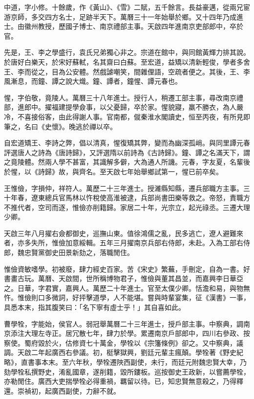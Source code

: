 \begin{pinyinscope}
中道，字小修。十餘歲，作《黃山》、《雪》二賦，五千餘言。長益豪邁，從兩兄宦游京師，多交四方名士，足跡半天下。萬曆三十一年始舉於鄉。又十四年乃成進士。由徽州教授，歷國子博士、南京禮部主事。天啟四年進南京吏部郎中，卒於官。

先是，王、李之學盛行，袁氏兄弟獨心非之。宗道在館中，與同館黃輝力排其說。於唐好白樂天，於宋好蘇軾，名其齋曰白蘇。至宏道，益矯以清新輕俊，學者多舍王、李而從之，目為公安體。然戲謔嘲笑，間雜俚語，空疏者便之。其後，王、李風漸息，而鐘、譚之說大熾。鐘、譚者，鐘惺、譚元春也。

惺，字伯敬，竟陵人。萬曆三十八年進士。授行人，稍遷工部主事，尋改南京禮部，進郎中。擢福建提學僉事，以父憂歸，卒於家。惺貌寢，羸不勝衣，為人嚴冷，不喜接俗客，由此得謝人事。官南都，僦秦淮水閣讀史，恒至丙夜，有所見即筆之，名曰《史懷》。晚逃於禪以卒。

自宏道矯王、李詩之弊，倡以清真，惺復矯其弊，變而為幽深孤峭。與同里譚元春評選唐人之詩為《唐詩歸》，又評選隋以前詩為《古詩歸》。鐘、譚之名滿天下，謂之竟陵體。然兩人學不甚富，其識解多僻，大為通人所譏。元春，字友夏，名輩後於惺，以《詩歸》故，與齊名。至天啟七年始舉鄉試第一，惺已前卒矣。

王惟儉，字損仲，祥符人。萬歷二十三年進士。授濰縣知縣，遷兵部職方主事。三十年春，遼東總兵官馬林以忤稅使高淮被逮，兵部尚書田樂等救之。帝怒，責職方不推代者，空司而逐，惟儉亦削籍歸。家居二十年，光宗立，起光祿丞。三遷大理少卿。

天啟三年八月擢右僉都御史，巡撫山東。值徐鴻儒之亂，民多逃亡，遼人避難來者，亦多失所，惟儉加意綏輯。五年三月擢南京兵部右侍郎，未赴。入為工部右侍郎，魏忠賢黨御史田景新劾之，落職閒住。

惟儉資敏嗜學。初被廢，肆力經史百家。苦《宋史》繁蕪，手刪定，自為一書。好書畫古玩。萬曆、天啟間，世所稱博物君子，惟儉與董其昌並，而嘉興李日華亞之。日華，字君實，嘉興人。萬歷二十年進士。官至太僕少卿。恬澹和易，與物無忤。惟儉則口多微詞，好抨擊道學，人不能堪。嘗與時輩宴集，征《漢書》一事，具悉本末，指其腹笑曰：「名下寧有虛士乎！」其自喜如此。

曹學牷，字能始，侯官人。弱冠舉萬曆二十三年進士，授戶部主事。中察典，調南京添注大理左寺正。居冗散七年，肆力於學。累遷南京戶部郎中，四川右參政、按察使。蜀府毀於火，估修資七十萬金，學牷以《宗籓條例》卻之。又中察典，議調。天啟二年起廣西右參議。初，梃擊獄興，劉廷元輩主瘋顛。學牷著《野史紀略》，直書事本末。至六年秋，學牷遷陜西副使，未行，而廷元附魏忠賢大幸，乃劾學牷私撰野史，淆亂國章，遂削籍，毀所鏤板。巡按御史王政新，以嘗薦學牷，亦勒閒住。廣西大吏揣學牷必得重禍，羈留以待。已，知忠賢無意殺之，乃得釋還。崇禎初，起廣西副使，力辭不就。


\end{pinyinscope}
